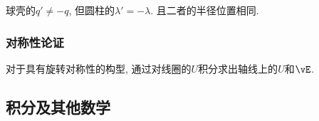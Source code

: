 \documentclass{ctexart}
\begin{document}
\begin{pitfall}
	球壳的$q'\neq -q$, 但圆柱的$\lambda' = -\lambda$. 且二者的半径位置相同.
\end{pitfall}

\subsubsection{对称性论证} %
\label{ssub:对称性论证}

\begin{finale}
	对于具有旋转对称性的构型, 通过对线圈的$U$积分求出轴线上的$U$和$\vE$.
\end{finale}



\subsection{积分及其他数学} %
\label{sub:积分及其他数学}
\end{document}
